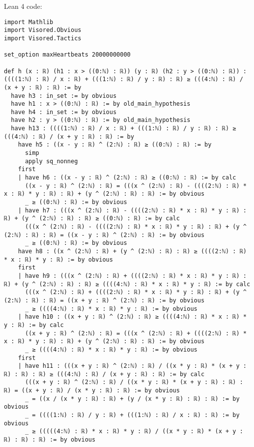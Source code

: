 \documentclass{article}
\begin{document}
Lean 4 code:
\begin{tcolorbox}[colback=white!10, width=\linewidth]
\begin{lstlisting}[language=Lean4]
import Mathlib
import Visored.Obvious
import Visored.Tactics

set_option maxHeartbeats 20000000000

def h (x : ℝ) (h1 : x > ((0:ℕ) : ℝ)) (y : ℝ) (h2 : y > ((0:ℕ) : ℝ)) : ((((1:ℕ) : ℝ) / x : ℝ) + (((1:ℕ) : ℝ) / y : ℝ) : ℝ) ≥ (((4:ℕ) : ℝ) / (x + y : ℝ) : ℝ) := by
  have h3 : in_set := by obvious
  have h1 : x > ((0:ℕ) : ℝ) := by old_main_hypothesis
  have h4 : in_set := by obvious
  have h2 : y > ((0:ℕ) : ℝ) := by old_main_hypothesis
  have h13 : ((((1:ℕ) : ℝ) / x : ℝ) + (((1:ℕ) : ℝ) / y : ℝ) : ℝ) ≥ (((4:ℕ) : ℝ) / (x + y : ℝ) : ℝ) := by
    have h5 : ((x - y : ℝ) ^ (2:ℕ) : ℝ) ≥ ((0:ℕ) : ℝ) := by
      simp
      apply sq_nonneg
    first
    | have h6 : ((x - y : ℝ) ^ (2:ℕ) : ℝ) ≥ ((0:ℕ) : ℝ) := by calc
      ((x - y : ℝ) ^ (2:ℕ) : ℝ) = (((x ^ (2:ℕ) : ℝ) - ((((2:ℕ) : ℝ) * x : ℝ) * y : ℝ) : ℝ) + (y ^ (2:ℕ) : ℝ) : ℝ) := by obvious
      _ ≥ ((0:ℕ) : ℝ) := by obvious
    | have h7 : (((x ^ (2:ℕ) : ℝ) - ((((2:ℕ) : ℝ) * x : ℝ) * y : ℝ) : ℝ) + (y ^ (2:ℕ) : ℝ) : ℝ) ≥ ((0:ℕ) : ℝ) := by calc
      (((x ^ (2:ℕ) : ℝ) - ((((2:ℕ) : ℝ) * x : ℝ) * y : ℝ) : ℝ) + (y ^ (2:ℕ) : ℝ) : ℝ) = ((x - y : ℝ) ^ (2:ℕ) : ℝ) := by obvious
      _ ≥ ((0:ℕ) : ℝ) := by obvious
    have h8 : ((x ^ (2:ℕ) : ℝ) + (y ^ (2:ℕ) : ℝ) : ℝ) ≥ ((((2:ℕ) : ℝ) * x : ℝ) * y : ℝ) := by obvious
    first
    | have h9 : (((x ^ (2:ℕ) : ℝ) + ((((2:ℕ) : ℝ) * x : ℝ) * y : ℝ) : ℝ) + (y ^ (2:ℕ) : ℝ) : ℝ) ≥ ((((4:ℕ) : ℝ) * x : ℝ) * y : ℝ) := by calc
      (((x ^ (2:ℕ) : ℝ) + ((((2:ℕ) : ℝ) * x : ℝ) * y : ℝ) : ℝ) + (y ^ (2:ℕ) : ℝ) : ℝ) = ((x + y : ℝ) ^ (2:ℕ) : ℝ) := by obvious
      _ ≥ ((((4:ℕ) : ℝ) * x : ℝ) * y : ℝ) := by obvious
    | have h10 : ((x + y : ℝ) ^ (2:ℕ) : ℝ) ≥ ((((4:ℕ) : ℝ) * x : ℝ) * y : ℝ) := by calc
      ((x + y : ℝ) ^ (2:ℕ) : ℝ) = (((x ^ (2:ℕ) : ℝ) + ((((2:ℕ) : ℝ) * x : ℝ) * y : ℝ) : ℝ) + (y ^ (2:ℕ) : ℝ) : ℝ) := by obvious
      _ ≥ ((((4:ℕ) : ℝ) * x : ℝ) * y : ℝ) := by obvious
    first
    | have h11 : (((x + y : ℝ) ^ (2:ℕ) : ℝ) / ((x * y : ℝ) * (x + y : ℝ) : ℝ) : ℝ) ≥ (((4:ℕ) : ℝ) / (x + y : ℝ) : ℝ) := by calc
      (((x + y : ℝ) ^ (2:ℕ) : ℝ) / ((x * y : ℝ) * (x + y : ℝ) : ℝ) : ℝ) = ((x + y : ℝ) / (x * y : ℝ) : ℝ) := by obvious
      _ = ((x / (x * y : ℝ) : ℝ) + (y / (x * y : ℝ) : ℝ) : ℝ) := by obvious
      _ = ((((1:ℕ) : ℝ) / y : ℝ) + (((1:ℕ) : ℝ) / x : ℝ) : ℝ) := by obvious
      _ ≥ (((((4:ℕ) : ℝ) * x : ℝ) * y : ℝ) / ((x * y : ℝ) * (x + y : ℝ) : ℝ) : ℝ) := by obvious

\end{lstlisting}
\end{tcolorbox}
\end{document}
